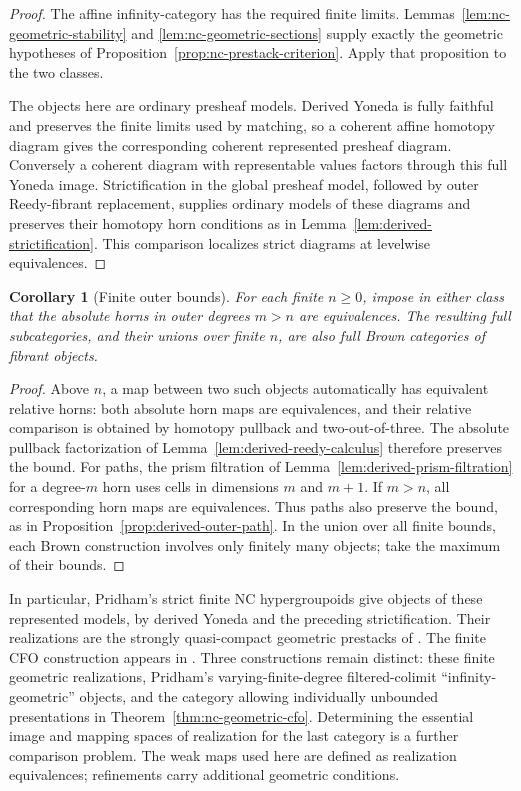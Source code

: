 \documentclass[12pt]{amsart}
\newtheorem{cor}[thm]{Corollary}
\theoremstyle{definition}
\theoremstyle{remark}
\numberwithin{equation}{section}
\begin{document}
\begin{proof}
The affine infinity-category has the required finite limits.
Lemmas~\ref{lem:nc-geometric-stability} and
\ref{lem:nc-geometric-sections} supply exactly the geometric
hypotheses of Proposition~\ref{prop:nc-prestack-criterion}. Apply
that proposition to the two classes.

The objects here are ordinary presheaf models. Derived Yoneda is
fully faithful and preserves the finite limits used by matching, so
a coherent affine homotopy diagram gives the corresponding
coherent represented presheaf diagram. Conversely a coherent
diagram with representable values factors through this full Yoneda
image. Strictification in the global presheaf model, followed by
outer Reedy-fibrant replacement, supplies ordinary models of these
diagrams and preserves their homotopy horn conditions as in
Lemma~\ref{lem:derived-strictification}. This comparison
localizes strict diagrams at levelwise equivalences.
\end{proof}

\begin{cor}[Finite outer bounds]\label{cor:nc-geometric-finite}
For each finite $n\ge0$, impose in either class that the absolute
horns in outer degrees $m>n$ are equivalences. The resulting full
subcategories, and their unions over finite $n$, are also full
Brown categories of fibrant objects.
\end{cor}

\begin{proof}
Above $n$, a map between two such objects automatically has
equivalent relative horns: both absolute horn maps are
equivalences, and their relative comparison is obtained by
homotopy pullback and two-out-of-three. The absolute pullback
factorization of Lemma~\ref{lem:derived-reedy-calculus} therefore
preserves the bound. For paths, the prism filtration of
Lemma~\ref{lem:derived-prism-filtration} for a degree-$m$ horn
uses cells in dimensions $m$ and $m+1$. If $m>n$, all
corresponding horn maps are equivalences. Thus paths also preserve
the bound, as in Proposition~\ref{prop:derived-outer-path}. In
the union over all finite bounds, each Brown construction involves
only finitely many objects; take the maximum of their bounds.
\end{proof}

In particular, Pridham's strict finite NC hypergroupoids give
objects of these represented models, by derived Yoneda and the
preceding strictification. Their realizations are the
strongly quasi-compact geometric prestacks of
\cite[Definitions~2.30--2.33]{PridhamNC2023}. The finite
CFO construction appears in
\cite[Remark~3.28, p.~21]{Pridham2013}.
Three constructions remain distinct: these finite geometric
realizations, Pridham's varying-finite-degree filtered-colimit
``infinity-geometric'' objects, and the category allowing
individually unbounded presentations in
Theorem~\ref{thm:nc-geometric-cfo}.
Determining the essential image and mapping spaces of realization
for the last category is a further comparison problem.
The weak maps used here are defined as realization equivalences;
refinements carry additional geometric conditions.
\end{document}

